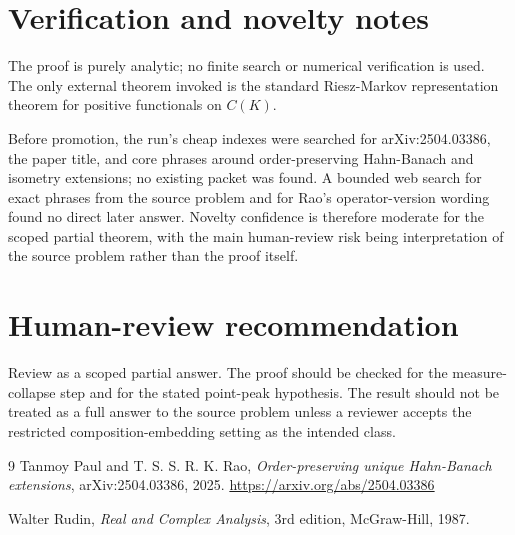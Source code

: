 \documentclass[11pt]{amsart}
\theoremstyle{definition}
\begin{document}
\section*{Verification and novelty notes}
The proof is purely analytic; no finite search or numerical verification is
used.  The only external theorem invoked is the standard Riesz-Markov
representation theorem for positive functionals on \(C(K)\).

Before promotion, the run's cheap indexes were searched for arXiv:2504.03386,
the paper title, and core phrases around order-preserving Hahn-Banach and
isometry extensions; no existing packet was found.  A bounded web search for exact
phrases from the source problem and for Rao's operator-version wording found
no direct later answer.  Novelty confidence is therefore moderate for the
scoped partial theorem, with the main human-review risk being interpretation
of the source problem rather than the proof itself.

\section*{Human-review recommendation}
Review as a scoped partial answer.  The proof should be checked for the
measure-collapse step and for the stated point-peak hypothesis.  The result
should not be treated as a full answer to the source problem unless a reviewer
accepts the restricted composition-embedding setting as the intended class.

\begin{thebibliography}{9}
Tanmoy Paul and T. S. S. R. K. Rao,
\emph{Order-preserving unique Hahn-Banach extensions},
arXiv:2504.03386, 2025.
\url{https://arxiv.org/abs/2504.03386}

Walter Rudin,
\emph{Real and Complex Analysis},
3rd edition, McGraw-Hill, 1987.
\end{thebibliography}
\end{document}
